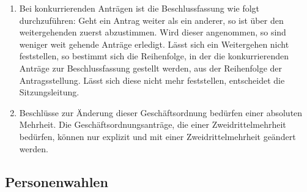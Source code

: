 \documentclass[draft,12pt,oneside]{scrreprt}
\begin{document}
\begin{enumerate}
  \item Bei konkurrierenden Anträgen ist die Beschlussfassung wie folgt durchzuführen:
        Geht ein Antrag weiter als ein anderer, so ist über den weitergehenden
        zuerst abzustimmen.
        Wird dieser angenommen, so sind weniger weit gehende Anträge erledigt.
        Lässt sich ein Weitergehen nicht feststellen, so bestimmt sich die
        Reihenfolge, in der die konkurrierenden Anträge zur Beschlussfassung
        gestellt werden, aus der Reihenfolge der Antragsstellung.
        Lässt sich diese nicht mehr feststellen, entscheidet die Sitzungsleitung.

  \item Beschlüsse zur Änderung dieser Geschäftsordnung bedürfen einer absoluten
        Mehrheit.
        Die Geschäftsordnungsanträge, die einer Zweidrittelmehrheit bedürfen, können nur
        explizit und mit einer Zweidrittelmehrheit geändert werden.

\end{enumerate}

\subsection{Personenwahlen}
\end{document}
